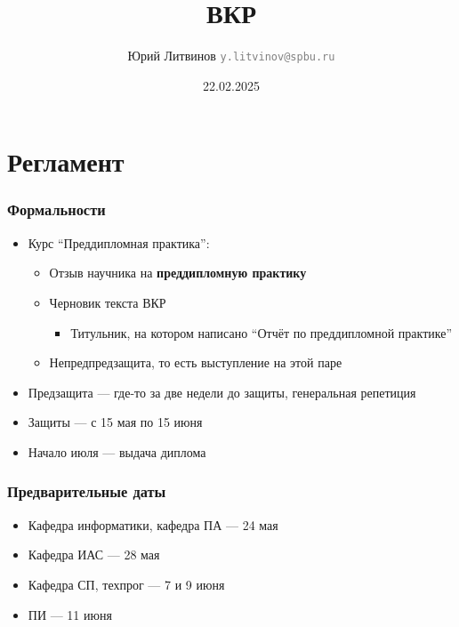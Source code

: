 \documentclass[xetex,mathserif,serif]{beamer}
\title{ВКР}
\author[Юрий Литвинов]{Юрий Литвинов \newline \textcolor{gray}{\small\texttt{y.litvinov@spbu.ru}}}
\date{22.02.2025}
\begin{document}
    \frame{\titlepage}

    \section{Регламент}

    \begin{frame}
        \frametitle{Формальности}
        \begin{itemize}
            \item Курс \enquote{Преддипломная практика}:
            \begin{itemize}
                \item Отзыв научника на \textbf{преддипломную практику}
                \item Черновик текста ВКР
                \begin{itemize}
                    \item Титульник, на котором написано \enquote{Отчёт по преддипломной практике}
                \end{itemize}
                \item Непредпредзащита, то есть выступление на этой паре
            \end{itemize}
            \item Предзащита --- где-то за две недели до защиты, генеральная репетиция
            \item Защиты --- с 15 мая по 15 июня
            \item Начало июля --- выдача диплома
        \end{itemize}
    \end{frame}

    \begin{frame}
        \frametitle{Предварительные даты}
        \begin{itemize}
            \item Кафедра информатики, кафедра ПА --- 24 мая
            \item Кафедра ИАС --- 28 мая
            \item Кафедра СП, техпрог --- 7 и 9 июня
            \item ПИ --- 11 июня
        \end{itemize}
    \end{frame}
\end{document}
